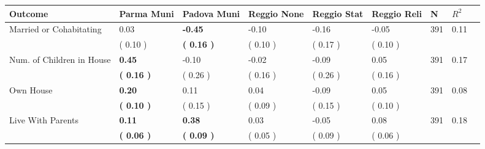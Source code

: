\begin{tabular}{L{6.2cm} C{1.8cm} C{1.8cm} C{1.8cm} C{1.8cm} C{1.8cm} C{1.8cm} C{0.3cm} C{0.3cm}}
\toprule
 \textbf{Outcome} & \textbf{Parma Muni} & \textbf{Padova Muni} & \textbf{Reggio None} & \textbf{Reggio Stat} & \textbf{Reggio Reli} & \textbf{N} & \textbf{$ R^2$} \\
\midrule
Married or Cohabitating &      0.03 & \textbf{    -0.45} &     -0.10 &     -0.16 &     -0.05  & 391 &       0.11 \\ 
 & (     0.10 ) & \textbf{(     0.16 )} & (     0.10 ) & (     0.17 ) & (     0.10 )  & \\
Num. of Children in House & \textbf{     0.45} &     -0.10 &     -0.02 &     -0.09 &      0.05  & 391 &       0.17 \\ 
 & \textbf{(     0.16 )} & (     0.26 ) & (     0.16 ) & (     0.26 ) & (     0.16 )  & \\
Own House & \textbf{     0.20} &      0.11 &      0.04 &     -0.09 &      0.05  & 391 &       0.08 \\ 
 & \textbf{(     0.10 )} & (     0.15 ) & (     0.09 ) & (     0.15 ) & (     0.10 )  & \\
Live With Parents & \textbf{     0.11} & \textbf{     0.38} &      0.03 &     -0.05 &      0.08  & 391 &       0.18 \\ 
 & \textbf{(     0.06 )} & \textbf{(     0.09 )} & (     0.05 ) & (     0.09 ) & (     0.06 )  & \\
\bottomrule
\end{tabular}
